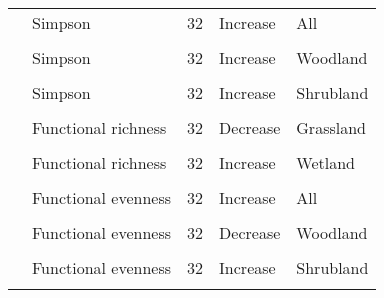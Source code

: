 \documentclass[
  12pt,
  oneside]{report}
\begin{document}
\begin{landscape}
\begin{longtable}[t]{llll>{\raggedright\arraybackslash}p{30em}}
\cite{schipper_contrasting_2016} & Simpson & 32 & Increase & All\\
\cellcolor{gray!6}{\cite{schipper_contrasting_2016}} & \cellcolor{gray!6}{Simpson} & \cellcolor{gray!6}{32} & \cellcolor{gray!6}{Stable} & \cellcolor{gray!6}{Grassland}\\
\cite{schipper_contrasting_2016} & Simpson & 32 & Increase & Woodland\\
\cellcolor{gray!6}{\cite{schipper_contrasting_2016}} & \cellcolor{gray!6}{Simpson} & \cellcolor{gray!6}{32} & \cellcolor{gray!6}{Increase} & \cellcolor{gray!6}{Wetland}\\
\addlinespace
\cite{schipper_contrasting_2016} & Simpson & 32 & Increase & Shrubland\\
\cellcolor{gray!6}{\cite{schipper_contrasting_2016}} & \cellcolor{gray!6}{Functional richness} & \cellcolor{gray!6}{32} & \cellcolor{gray!6}{Increase} & \cellcolor{gray!6}{All}\\
\cite{schipper_contrasting_2016} & Functional richness & 32 & Decrease & Grassland\\
\cellcolor{gray!6}{\cite{schipper_contrasting_2016}} & \cellcolor{gray!6}{Functional richness} & \cellcolor{gray!6}{32} & \cellcolor{gray!6}{Increase} & \cellcolor{gray!6}{Woodland}\\
\cite{schipper_contrasting_2016} & Functional richness & 32 & Increase & Wetland\\
\addlinespace
\cellcolor{gray!6}{\cite{schipper_contrasting_2016}} & \cellcolor{gray!6}{Functional richness} & \cellcolor{gray!6}{32} & \cellcolor{gray!6}{Decrease} & \cellcolor{gray!6}{Shrubland}\\
\cite{schipper_contrasting_2016} & Functional evenness & 32 & Increase & All\\
\cellcolor{gray!6}{\cite{schipper_contrasting_2016}} & \cellcolor{gray!6}{Functional evenness} & \cellcolor{gray!6}{32} & \cellcolor{gray!6}{Increase} & \cellcolor{gray!6}{Grassland}\\
\cite{schipper_contrasting_2016} & Functional evenness & 32 & Decrease & Woodland\\
\cellcolor{gray!6}{\cite{schipper_contrasting_2016}} & \cellcolor{gray!6}{Functional evenness} & \cellcolor{gray!6}{32} & \cellcolor{gray!6}{Increase} & \cellcolor{gray!6}{Wetland}\\
\addlinespace
\cite{schipper_contrasting_2016} & Functional evenness & 32 & Increase & Shrubland\\
\cellcolor{gray!6}{\cite{pilotto_meta-analysis_2020}} & \cellcolor{gray!6}{SR} & \cellcolor{gray!6}{1402} & \cellcolor{gray!6}{Decrease} & \cellcolor{gray!6}{Dataset S004, temporal grain = 1 month}\\

\end{longtable}
\end{landscape}
\end{document}
